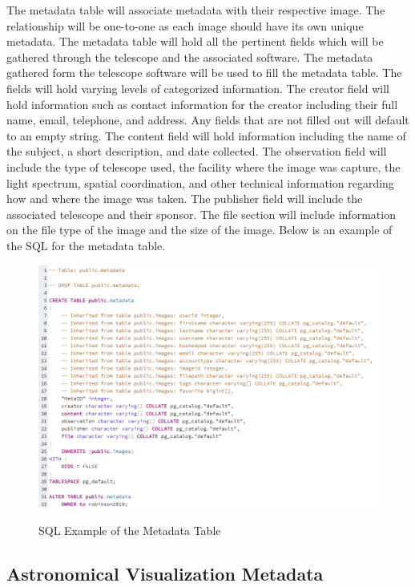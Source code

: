 \documentclass[12pt]{report}
\begin{document}
The metadata table will associate metadata with their respective image.  The relationship will be one-to-one as each image should have its own unique metadata.  The metadata table will hold all the pertinent fields which will be gathered through the telescope and the associated software.  The metadata gathered form the telescope software will be used to fill the metadata table.  The fields will hold varying levels of categorized information.  The creator field will hold information such as contact information for the creator including their full name, email, telephone, and address.  Any fields that are not filled out will default to an empty string.  The content field will hold information including the name of the subject, a short description, and date collected.  The observation field will include the type of telescope used, the facility where the image was capture, the light spectrum, spatial coordination, and other technical information regarding how and where the image was taken.  The publisher field will include the associated telescope and their sponsor.  The file section will include information on the file type of the image and the size of the image.  Below is an example of the SQL for the metadata table.

\begin{figure}[h]
	\centering
	\caption{SQL Example of the Metadata Table}
	\includegraphics[width=\linewidth]{database_metadata_table}
	\label{fig:SQL Metadata Table}
\end{figure}

\subsection{Astronomical Visualization Metadata}
\end{document}
